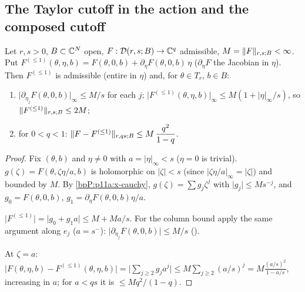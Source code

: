 \subsection{The Taylor cutoff in the action and the composed cutoff}\label{bpP:p11a:sec-taylor}

\begin{lemma}\label{bpP:p11a:taylor-cutoff}
Let $r,s>0$, $B\subset\mathbb{C}^N$ open, $F:\mathcal D(r,s;B)\to\mathbb{C}^q$ admissible, $M=\lVert F\rVert_{r,s;B}<\infty$. Put $F^{(\le1)}(\theta,\eta,b)=F(\theta,0,b)+\partial_\eta F(\theta,0,b)\,\eta$ ($\partial_\eta F$ the Jacobian in $\eta$). Then $F^{(\le1)}$ is admissible (entire in $\eta$) and, for $\theta\in T_r$, $b\in B$:
\begin{enumerate}[label=(\alph*)]
\item $\lvert\partial_{\eta_j}F(\theta,0,b)\rvert_\infty\le M/s$ for each $j$; $\lvert F^{(\le1)}(\theta,\eta,b)\rvert_\infty\le M(1+\lvert\eta\rvert_\infty/s)$, so $\lVert F^{(\le1)}\rVert_{r,s;B}\le2M$;
\item for $0<q<1$: $\lVert F-F^{(\le1)}\rVert_{r,qs;B}\le M\,\dfrac{q^2}{1-q}$.
\end{enumerate}
\end{lemma}
\begin{proof}
\label{stepP:p11a:tc-line} Fix $(\theta,b)$ and $\eta\ne0$ with $a=\lvert\eta\rvert_\infty<s$ ($\eta=0$ is trivial). $g(\zeta)=F(\theta,\zeta\eta/a,b)$ is holomorphic on $\lvert\zeta\rvert<s$ (since $\lvert\zeta\eta/a\rvert_\infty=\lvert\zeta\rvert$) and bounded by $M$. By \ref{bpP:p11a:x-cauchy}, $g(\zeta)=\sum g_j\zeta^j$ with $\lvert g_j\rvert\le Ms^{-j}$, and $g_0=F(\theta,0,b)$, $g_1=\partial_\eta F(\theta,0,b)\eta/a$.

\label{stepP:p11a:tc-a} $\lvert F^{(\le1)}\rvert=\lvert g_0+g_1a\rvert\le M+Ma/s$. For the column bound apply the same argument along $e_j$ ($a=s^-$): $\lvert\partial_{\eta_j}F(\theta,0,b)\rvert\le M/s$ ().

\label{stepP:p11a:tc-b} At $\zeta=a$: $\lvert F(\theta,\eta,b)-F^{(\le1)}(\theta,\eta,b)\rvert=\lvert\sum_{j\ge2}g_ja^j\rvert\le M\sum_{j\ge2}(a/s)^j=M\frac{(a/s)^2}{1-a/s}$, increasing in $a$; for $a<qs$ it is $\le Mq^2/(1-q)$.
\end{proof}

